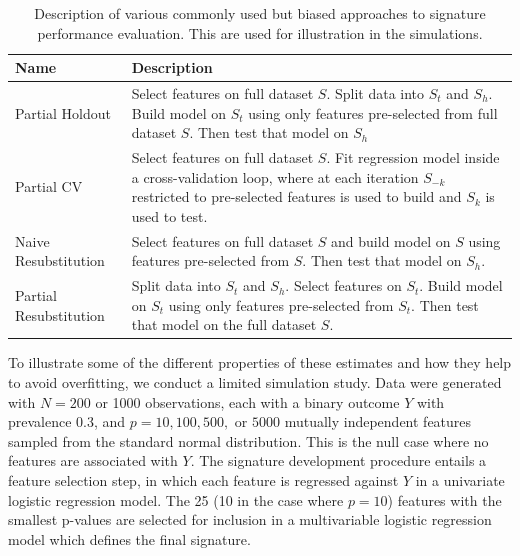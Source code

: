 \documentclass[11pt,]{article}
\begin{document}
\begin{table}
\caption{Description of various commonly used but biased approaches to signature performance evaluation. This are used for illustration in the simulations. \label{descript} }
\begin{center}
\begin{tabular}[!ht]{l|p{3in}}
Name & Description \\
\hline
Partial Holdout & Select features on full dataset $S$. Split data into $S_t$ and $S_h$. Build model on $S_t$ using only features pre-selected from full dataset $S$. Then test that model on $S_h$ \\
Partial CV  & Select features on full dataset $S$. Fit regression model inside a cross-validation loop, where at each iteration $S_{-k}$ restricted to pre-selected features is used to build and $S_k$ is used to test. \\
Naive Resubstitution & Select features on full dataset $S$ and build model on $S$ using features pre-selected from $S$. Then test that model on $S_h$. \\
Partial Resubstitution & Split data into $S_t$ and $S_h$. Select features on $S_t$. Build model on $S_t$ using only features pre-selected from $S_t$. Then test that model on the full dataset $S$. \\
\end{tabular}
\end{center}
\end{table}

To illustrate some of the different properties of these estimates and
how they help to avoid overfitting, we conduct a limited simulation
study. Data were generated with \(N = 200\) or 1000 observations, each
with a binary outcome \(Y\) with prevalence 0.3, and
\(p = 10, 100, 500,\) or \(5000\) mutually independent features sampled
from the standard normal distribution. This is the null case where no
features are associated with \(Y\). The signature development procedure
entails a feature selection step, in which each feature is regressed
against \(Y\) in a univariate logistic regression model. The 25 (10 in
the case where \(p = 10\)) features with the smallest p-values are
selected for inclusion in a multivariable logistic regression model
which defines the final signature.
\end{document}
